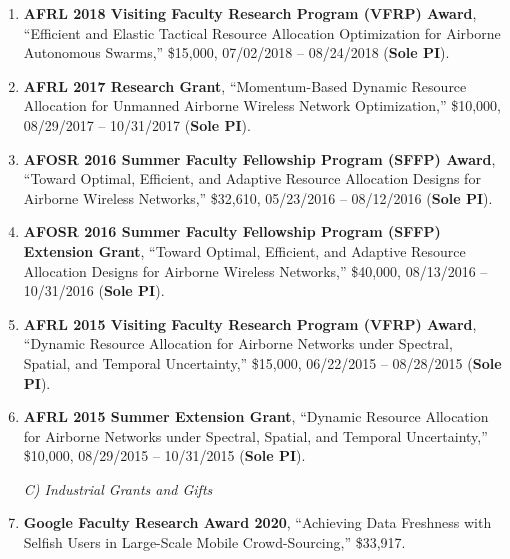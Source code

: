\documentclass[overlapped,line,letterpaper]{res1}
\begin{document}
\begin{resume}
\begin{enumerate}
\vspace*{.08in} \item {\bf AFRL 2018 Visiting Faculty Research Program (VFRP) Award}, ``Efficient and Elastic Tactical Resource Allocation Optimization for Airborne Autonomous Swarms,''  \$15,000, 07/02/2018 -- 08/24/2018 ({\bf Sole PI}).

\vspace*{.08in} \item {\bf AFRL 2017 Research Grant}, ``Momentum-Based Dynamic Resource Allocation for Unmanned Airborne
Wireless Network Optimization,''  \$10,000, 08/29/2017 -- 10/31/2017 ({\bf Sole PI}).

\vspace*{.08in} \item {\bf AFOSR 2016 Summer Faculty Fellowship Program (SFFP) Award}, ``Toward Optimal, Efficient, and Adaptive Resource Allocation Designs for Airborne Wireless Networks,'' \$32,610, 05/23/2016 -- 08/12/2016 ({\bf Sole PI}).

\vspace*{.08in} \item {\bf AFOSR 2016 Summer Faculty Fellowship Program (SFFP) Extension Grant}, ``Toward Optimal, Efficient, and Adaptive Resource Allocation Designs for Airborne Wireless Networks,''  \$40,000, 08/13/2016 -- 10/31/2016 ({\bf Sole PI}).

\vspace*{.08in} \item {\bf AFRL 2015 Visiting Faculty Research Program (VFRP) Award}, ``Dynamic Resource Allocation for Airborne Networks under Spectral, Spatial, and Temporal Uncertainty,''  \$15,000, 06/22/2015 -- 08/28/2015 ({\bf Sole PI}).

\vspace*{.08in} \item {\bf AFRL 2015 Summer Extension Grant}, ``Dynamic Resource Allocation for Airborne Networks under Spectral, Spatial, and Temporal Uncertainty,''  \$10,000, 08/29/2015 -- 10/31/2015 ({\bf Sole PI}).

\vspace*{.08in}
\hspace{-.55in}  {\em C) Industrial Grants and Gifts}

\vspace*{.08in} \item {\bf Google Faculty Research Award 2020}, ``Achieving Data Freshness with Selfish Users in Large-Scale Mobile Crowd-Sourcing,'' \$33,917.


\end{enumerate}
\end{resume}
\end{document}
